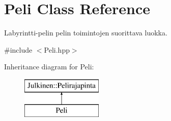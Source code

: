 \hypertarget{class_peli}{}\section{Peli Class Reference}
\label{class_peli}


Labyrintti-\/pelin pelin toimintojen suorittava luokka.  




{\ttfamily \#include $<$Peli.\+hpp$>$}

Inheritance diagram for Peli\+:\begin{figure}[H]
\begin{center}
\leavevmode
\includegraphics[height=2.000000cm]{class_peli}
\end{center}
\end{figure}
